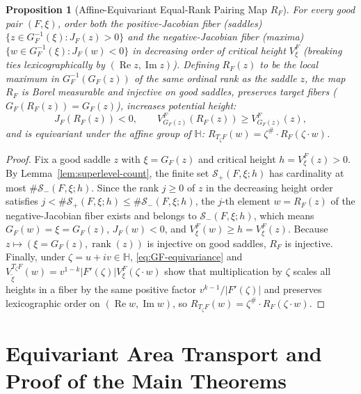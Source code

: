 \documentclass[12pt]{article}
\def\H{\mathbb{H}}
\def\S{\mathcal{S}}
\newtheorem{prop}[thm]{Proposition}
\theoremstyle{definition}
\numberwithin{equation}{section}
\begin{document}
\begin{prop}[Affine-Equivariant Equal-Rank Pairing Map $R_F$]\label{prop:RF-pairing}
For every good pair $(F, \xi)$, order both the positive-Jacobian fiber (saddles) $\{z \in G_F^{-1}(\xi) : J_F(z) > 0\}$ and the negative-Jacobian fiber (maxima) $\{w \in G_F^{-1}(\xi) : J_F(w) < 0\}$ in decreasing order of critical height $V_\xi^F$ (breaking ties lexicographically by $(\operatorname{Re} z, \operatorname{Im} z)$). Defining $R_F(z)$ to be the local maximum in $G_F^{-1}(G_F(z))$ of the same ordinal rank as the saddle $z$, the map $R_F$ is Borel measurable and injective on good saddles, preserves target fibers ($G_F(R_F(z)) = G_F(z)$), increases potential height:
\begin{equation}\label{eq:RF-height-increase}
  J_F(R_F(z)) < 0, \qquad V_{G_F(z)}^F(R_F(z)) \ge V_{G_F(z)}^F(z),
\end{equation}
and is equivariant under the affine group of $\H$: $R_{T_\zeta F}(w) = \zeta^\# \cdot R_F(\zeta \cdot w)$.
\end{prop}

\begin{proof}
Fix a good saddle $z$ with $\xi = G_F(z)$ and critical height $h = V_\xi^F(z) > 0$. By Lemma~\ref{lem:superlevel-count}, the finite set $\S_+(F, \xi; h)$ has cardinality at most $\#\S_-(F, \xi; h)$. Since the rank $j \ge 0$ of $z$ in the decreasing height order satisfies $j < \#\S_+(F, \xi; h) \le \#\S_-(F, \xi; h)$, the $j$-th element $w = R_F(z)$ of the negative-Jacobian fiber exists and belongs to $\S_-(F, \xi; h)$, which means $G_F(w) = \xi = G_F(z)$, $J_F(w) < 0$, and $V_\xi^F(w) \ge h = V_\xi^F(z)$. Because $z \mapsto (\xi = G_F(z), \operatorname{rank}(z))$ is injective on good saddles, $R_F$ is injective. Finally, under $\zeta = u + iv \in \H$, \eqref{eq:GF-equivariance} and $V_{\tilde{\xi}}^{T_\zeta F}(w) = v^{1-k} |F'(\zeta)| V_\xi^F(\zeta \cdot w)$ show that multiplication by $\zeta$ scales all heights in a fiber by the same positive factor $v^{k-1}/|F'(\zeta)|$ and preserves lexicographic order on $(\operatorname{Re} w, \operatorname{Im} w)$, so $R_{T_\zeta F}(w) = \zeta^\# \cdot R_F(\zeta \cdot w)$.
\end{proof}

\section{Equivariant Area Transport and Proof of the Main Theorems}
\end{document}
